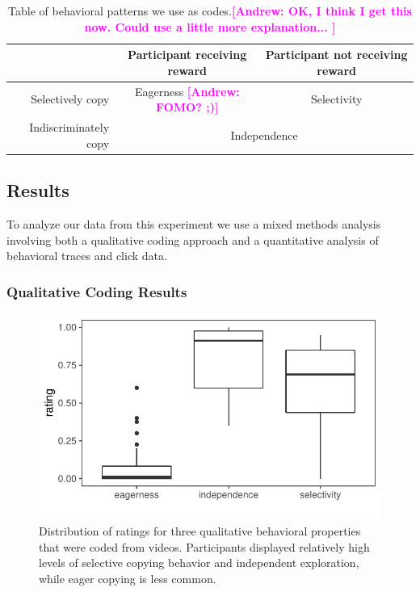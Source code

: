 \documentclass[12pt,letterpaper]{article}
\newcommand{\andrew}[1]{\textcolor{magenta}{\bf [Andrew: #1]}}
\begin{document}
\begin{table}[]
\begin{tabular}{r|c|c}
                      & Participant receiving reward & Participant not receiving reward  \\ \hline
Selectively copy  & Eagerness \andrew{FOMO? ;)}                  & \multicolumn{1}{c|}{Selectivity} \\ \hline
Indiscriminately copy &  \multicolumn{2}{c|}{Independence}  \\ \cline{1-3} 
\end{tabular}
\caption{Table of behavioral patterns we use as codes.\andrew{OK, I think I get this now.  Could use a little more explanation... }}
\label{tab:qual_scoring_defs}
\end{table}

\subsection{Results}

To analyze our data from this experiment we use a mixed methods analysis involving both a qualitative coding approach and a quantitative analysis of behavioral traces and click data. 

\subsubsection{Qualitative Coding Results}

\begin{figure}[t!]
    \centering
    \includegraphics[width=0.9\linewidth]{figures/coding.pdf}
    \caption{Distribution of ratings for three qualitative behavioral properties that were coded from videos. Participants displayed relatively high levels of selective copying behavior and independent exploration, while eager copying is less common.}
    \label{fig:selective}
\end{figure}
\end{document}
